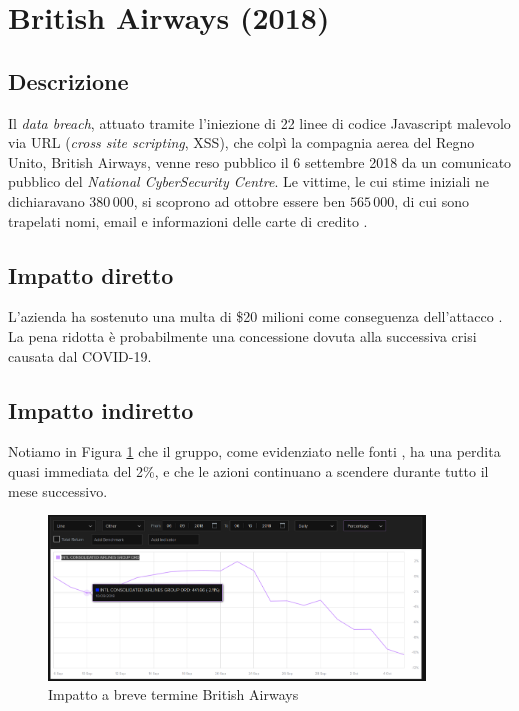 \documentclass[12pt,a4paper,twoside]{report}
\begin{document}
\section{British Airways (2018)}
\subsection{Descrizione}
Il \textit{data breach}, attuato tramite l'iniezione di 22 linee di codice Javascript malevolo via URL (\textit{cross site scripting}, XSS), che colp\`i la compagnia aerea del Regno Unito, British Airways, venne reso pubblico il 6 settembre 2018 da un comunicato pubblico del \textit{National CyberSecurity Centre}. Le vittime, le cui stime iniziali ne dichiaravano $380\,000$, si scoprono ad ottobre essere ben $565\,000$, di cui sono trapelati nomi, email e informazioni delle carte di credito \cite{BritAir}.\\ 
\subsection{Impatto diretto}
L'azienda ha sostenuto una multa di \$20 milioni come conseguenza dell'attacco \cite{BritAir}. La pena ridotta \`e probabilmente una concessione dovuta alla successiva crisi causata dal COVID-19.\\
\subsection{Impatto indiretto}
Notiamo in Figura \ref{fig:britair1} \cite{lse_britair} che il gruppo, come evidenziato nelle fonti \cite{BritAir}, ha una perdita quasi immediata del 2\%, e che le azioni continuano a scendere durante tutto il mese successivo.

\begin{figure}[H] 
\begin{center} 
\includegraphics[width=10cm]{figures/britAir_short.png} 
\caption[Grafico British Airways short]{Impatto a breve termine British Airways}\label{fig:britair1}
\end{center}
\end{figure}
\end{document}
